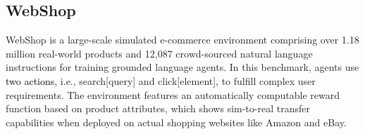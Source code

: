 \documentclass[11pt]{article}
\begin{document}
\begin{table}[t]
\begin{center}
\renewcommand{\arraystretch}{1.05}
\setlength\tabcolsep{23pt}
\end{center}
\vspace{-0.2cm}
\caption{\textcolor{black}{Failure modes used in Agent-In-World across ALFWorld, WebShop, and search-augmented QA tasks.}}
\label{tab:failure_modes}
\vspace{-0.5cm}
\end{table}


\subsection{WebShop}
WebShop is a large-scale simulated e-commerce environment comprising over 1.18 million real-world products and 12,087 crowd-sourced natural language instructions for training grounded language agents. In this benchmark, agents  use \textcolor{black}{two actions}, i.e., search[query] and click[element], to fulfill complex user requirements. The environment features an automatically computable reward function based on product attributes, which shows sim-to-real transfer capabilities when deployed on actual shopping websites like Amazon and eBay.
\end{document}
